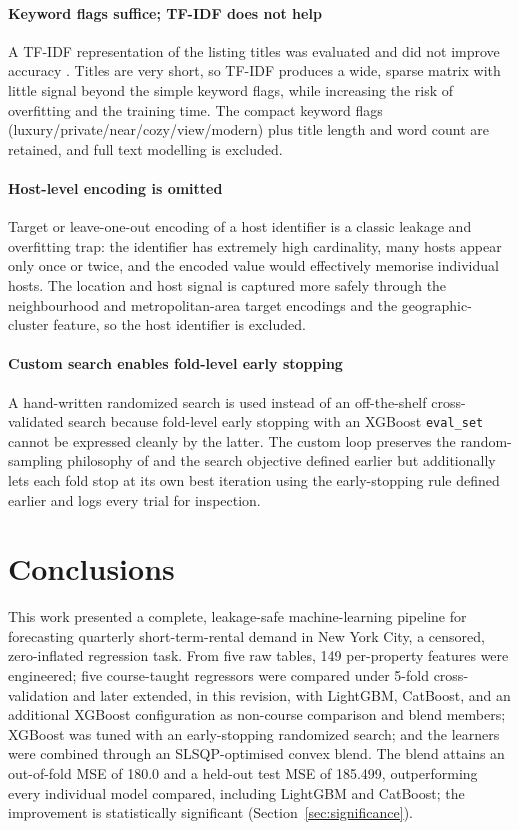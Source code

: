 \documentclass[journal]{IEEEtran}
\begin{document}
\paragraph{Keyword flags suffice; TF-IDF does not help} A TF-IDF representation of
the listing titles was evaluated and did not improve accuracy
\cite{islam2022}. Titles are very short, so TF-IDF produces a wide, sparse matrix
with little signal beyond the simple keyword flags, while increasing the risk of
overfitting and the training time. The compact keyword flags
(luxury/private/near/cozy/view/modern) plus title length and word count are
retained, and full text modelling is excluded.

\paragraph{Host-level encoding is omitted} Target or leave-one-out encoding of a
host identifier is a classic leakage and overfitting trap: the identifier has
extremely high cardinality, many hosts appear only once or twice, and the encoded
value would effectively memorise individual hosts. The location and host signal
is captured more safely through the neighbourhood and metropolitan-area target
encodings and the geographic-cluster feature, so the host identifier is excluded.

\paragraph{Custom search enables fold-level early stopping} A hand-written
randomized search is used instead of an off-the-shelf cross-validated search
because fold-level early stopping with an XGBoost \texttt{eval\_set} cannot be
expressed cleanly by the latter. The custom loop preserves the random-sampling
philosophy of \cite{bergstra2012random} and the search objective defined
earlier but additionally lets each fold stop at its own best iteration using
the early-stopping rule defined earlier and logs every trial for inspection.

\section{Conclusions}
\label{sec:concl}
This work presented a complete, leakage-safe machine-learning pipeline for
forecasting quarterly short-term-rental demand in New York City, a censored,
zero-inflated regression task. From five raw tables, 149 per-property features
were engineered; five course-taught regressors were compared under 5-fold
cross-validation and later extended, in this revision, with LightGBM, CatBoost,
and an additional XGBoost configuration as non-course comparison and blend
members; XGBoost was tuned with an early-stopping randomized search; and the
learners were combined through an SLSQP-optimised convex blend. The blend
attains an out-of-fold MSE of 180.0 and a held-out test MSE of 185.499,
outperforming every individual model compared, including LightGBM and CatBoost;
the improvement is statistically significant (Section~\ref{sec:significance}).
\end{document}
